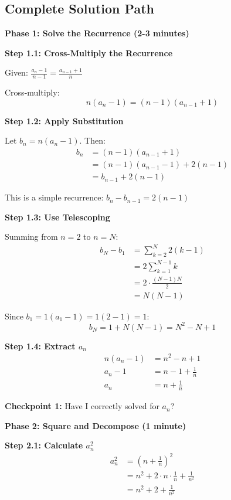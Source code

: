 \documentclass[12pt]{article}
\begin{document}
\begin{solutionbox}

\subsection*{Complete Solution Path}

\textbf{Phase 1: Solve the Recurrence (2-3 minutes)}

\textbf{Step 1.1: Cross-Multiply the Recurrence}

Given: $\frac{a_n -1}{n-1}=\frac{a_{n-1}+1}{n}$

Cross-multiply:
\[n(a_n - 1) = (n-1)(a_{n-1} + 1)\]

\textbf{Step 1.2: Apply Substitution}

Let $b_n = n(a_n - 1)$. Then:
\begin{align*}
b_n &= (n-1)(a_{n-1} + 1) \\
&= (n-1)(a_{n-1} - 1) + 2(n-1) \\
&= b_{n-1} + 2(n-1)
\end{align*}

This is a simple recurrence: $b_n - b_{n-1} = 2(n-1)$

\textbf{Step 1.3: Use Telescoping}

Summing from $n=2$ to $n=N$:
\begin{align*}
b_N - b_1 &= \sum_{k=2}^{N} 2(k-1) \\
&= 2\sum_{k=1}^{N-1} k \\
&= 2 \cdot \frac{(N-1)N}{2} \\
&= N(N-1)
\end{align*}

Since $b_1 = 1(a_1 - 1) = 1(2-1) = 1$:
\[b_N = 1 + N(N-1) = N^2 - N + 1\]

\textbf{Step 1.4: Extract $a_n$}
\begin{align*}
n(a_n - 1) &= n^2 - n + 1 \\
a_n - 1 &= n - 1 + \frac{1}{n} \\
a_n &= n + \frac{1}{n}
\end{align*}

\textbf{Checkpoint 1:} Have I correctly solved for $a_n$?

\textbf{Phase 2: Square and Decompose (1 minute)}

\textbf{Step 2.1: Calculate $a_n^2$}
\begin{align*}
a_n^2 &= \left(n + \frac{1}{n}\right)^2 \\
&= n^2 + 2 \cdot n \cdot \frac{1}{n} + \frac{1}{n^2} \\
&= n^2 + 2 + \frac{1}{n^2}
\end{align*}


\end{solutionbox}
\end{document}
